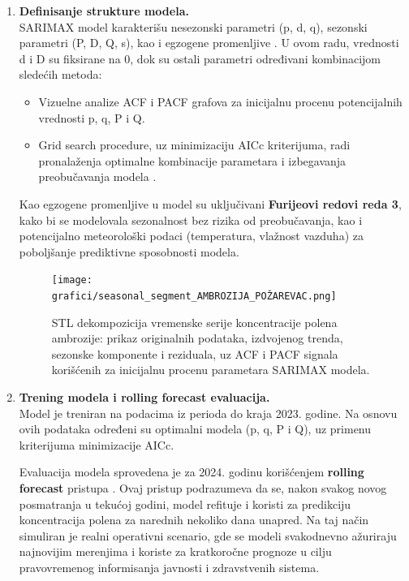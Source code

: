 \documentclass[12pt]{article}
\begin{document}
\begin{enumerate}
    \item \textbf{Definisanje strukture modela.} \\
    SARIMAX model karakterišu nesezonski parametri (p, d, q), sezonski parametri (P, D, Q, s), kao i egzogene promenljive \cite{box1970, brockwell2002}. U ovom radu, vrednosti d i D su fiksirane na 0, dok su ostali parametri određivani kombinacijom sledećih metoda:
    \begin{itemize}
        \item Vizuelne analize ACF i PACF grafova za inicijalnu procenu potencijalnih vrednosti p, q, P i Q.
        \item Grid search procedure, uz minimizaciju AICc kriterijuma, radi pronalaženja optimalne kombinacije parametara i izbegavanja preobučavanja modela \cite{burnham2002}.
    \end{itemize}

    Kao egzogene promenljive u model su uključivani \textbf{Furijeovi redovi reda 3}, kako bi se modelovala sezonalnost bez rizika od preobučavanja, kao i potencijalno meteorološki podaci (temperatura, vlažnost vazduha) za poboljšanje prediktivne sposobnosti modela.

    
    \begin{figure}[H]
        \centering
        \texttt{[image: grafici/seasonal\_segment\_AMBROZIJA\_POŽAREVAC.png]}
        \caption{STL dekompozicija vremenske serije koncentracije polena ambrozije: prikaz originalnih podataka, izdvojenog trenda, sezonske komponente i reziduala, uz ACF i PACF signala korišćenih za inicijalnu procenu parametara SARIMAX modela.}
        \label{fig:seasonal_segment_ambrozija}
    \end{figure}

    \item \textbf{Trening modela i rolling forecast evaluacija.} \\
    Model je treniran na podacima iz perioda do kraja 2023. godine. Na osnovu ovih podataka određeni su optimalni modela (p, q, P i Q), uz primenu kriterijuma minimizacije AICc.

    Evaluacija modela sprovedena je za 2024. godinu korišćenjem \textbf{rolling forecast} pristupa \cite{bergmeir2012use}. Ovaj pristup podrazumeva da se, nakon svakog novog posmatranja u tekućoj godini, model refituje i koristi za predikciju koncentracija polena za narednih nekoliko dana unapred. Na taj način simuliran je realni operativni scenario, gde se modeli svakodnevno ažuriraju najnovijim merenjima i koriste za kratkoročne prognoze u cilju pravovremenog informisanja javnosti i zdravstvenih sistema.


\end{enumerate}
\end{document}
